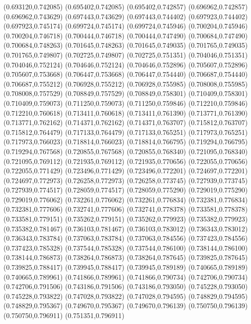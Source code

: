 (0.693120,0.742085)
(0.695402,0.742085)
(0.695402,0.742857)
(0.696962,0.742857)
(0.696962,0.743629)
(0.697443,0.743629)
(0.697443,0.744402)
(0.697923,0.744402)
(0.697923,0.745174)
(0.699724,0.745174)
(0.699724,0.745946)
(0.700204,0.745946)
(0.700204,0.746718)
(0.700444,0.746718)
(0.700444,0.747490)
(0.700684,0.747490)
(0.700684,0.748263)
(0.701645,0.748263)
(0.701645,0.749035)
(0.701765,0.749035)
(0.701765,0.749807)
(0.702725,0.749807)
(0.702725,0.751351)
(0.704046,0.751351)
(0.704046,0.752124)
(0.704646,0.752124)
(0.704646,0.752896)
(0.705607,0.752896)
(0.705607,0.753668)
(0.706447,0.753668)
(0.706447,0.754440)
(0.706687,0.754440)
(0.706687,0.755212)
(0.706928,0.755212)
(0.706928,0.755985)
(0.708008,0.755985)
(0.708008,0.757529)
(0.708849,0.757529)
(0.708849,0.758301)
(0.710409,0.758301)
(0.710409,0.759073)
(0.711250,0.759073)
(0.711250,0.759846)
(0.712210,0.759846)
(0.712210,0.760618)
(0.713411,0.760618)
(0.713411,0.761390)
(0.713771,0.761390)
(0.713771,0.762162)
(0.714371,0.762162)
(0.714371,0.763707)
(0.715812,0.763707)
(0.715812,0.764479)
(0.717133,0.764479)
(0.717133,0.765251)
(0.717973,0.765251)
(0.717973,0.766023)
(0.718814,0.766023)
(0.718814,0.766795)
(0.719294,0.766795)
(0.719294,0.767568)
(0.720855,0.767568)
(0.720855,0.768340)
(0.721095,0.768340)
(0.721095,0.769112)
(0.721935,0.769112)
(0.721935,0.770656)
(0.722055,0.770656)
(0.722055,0.771429)
(0.723496,0.771429)
(0.723496,0.772201)
(0.724697,0.772201)
(0.724697,0.772973)
(0.726258,0.772973)
(0.726258,0.773745)
(0.727939,0.773745)
(0.727939,0.774517)
(0.728059,0.774517)
(0.728059,0.775290)
(0.729019,0.775290)
(0.729019,0.776062)
(0.732261,0.776062)
(0.732261,0.776834)
(0.732381,0.776834)
(0.732381,0.777606)
(0.732741,0.777606)
(0.732741,0.778378)
(0.733581,0.778378)
(0.733581,0.779151)
(0.735262,0.779151)
(0.735262,0.779923)
(0.735382,0.779923)
(0.735382,0.781467)
(0.736103,0.781467)
(0.736103,0.783012)
(0.736343,0.783012)
(0.736343,0.783784)
(0.737063,0.783784)
(0.737063,0.784556)
(0.737423,0.784556)
(0.737423,0.785328)
(0.737544,0.785328)
(0.737544,0.786100)
(0.738144,0.786100)
(0.738144,0.786873)
(0.738264,0.786873)
(0.738264,0.787645)
(0.739825,0.787645)
(0.739825,0.788417)
(0.739945,0.788417)
(0.739945,0.789189)
(0.740665,0.789189)
(0.740665,0.789961)
(0.741866,0.789961)
(0.741866,0.790734)
(0.742706,0.790734)
(0.742706,0.791506)
(0.743186,0.791506)
(0.743186,0.793050)
(0.745228,0.793050)
(0.745228,0.793822)
(0.747028,0.793822)
(0.747028,0.794595)
(0.748829,0.794595)
(0.748829,0.795367)
(0.749670,0.795367)
(0.749670,0.796139)
(0.750750,0.796139)
(0.750750,0.796911)
(0.751351,0.796911)
